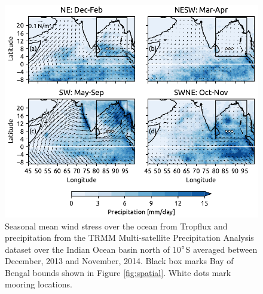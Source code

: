 \documentclass[onecol]{ametsoc}
\begin{document}
\begin{figure}
\centering
\includegraphics[width=33pc]{figure1-ppt.pdf}
\caption{\label{fig:ppt}
Seasonal mean wind stress over the ocean from Tropflux \citep{Kumar2012} and precipitation from the TRMM Multi-satellite Precipitation Analysis dataset \citep{trmm} over the Indian Ocean basin north of 10\(\degree\)S averaged between December, 2013 and November, 2014. Black box marks Bay of Bengal bounds shown in Figure \ref{fig:spatial}. White dots mark mooring locations.}
\end{figure}
\end{document}
